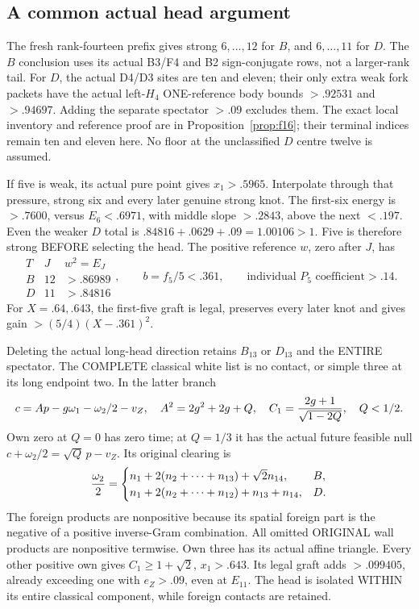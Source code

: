 \subsection{A common actual head argument}
\label{app:arithBD14typedhead}

The fresh rank-fourteen prefix gives strong
\(6,\ldots,12\) for \(B\), and \(6,\ldots,11\)
for \(D\).
The \(B\) conclusion uses its actual B3/F4 and
B2 sign-conjugate rows, not a larger-rank tail.
For \(D\), the actual D4/D3 sites are ten and eleven;
their only extra weak fork packets have the actual
left-\(H_4\) ONE-reference body bounds
\(>.92531\) and \(>.94697\).
Adding the separate spectator \(>.09\) excludes them.
The exact local inventory and reference proof are
in Proposition~\ref{prop:f16}; their terminal
indices remain ten and eleven here.
No floor at the unclassified \(D\) centre twelve
is assumed.

If five is weak, its actual pure point gives
\(x_1>.5965\).
Interpolate through that pressure, strong six and
every later genuine strong knot.
The first-six energy is \(>.7600\), versus \(E_6<.6971\),
with middle slope \(>.2843\), above the next \(<.197\).
Even the weaker \(D\) total is
\(.84816+.0629+.09=1.00106>1\).
Five is therefore strong BEFORE selecting the head.
The positive reference \(w\), zero after \(J\), has
\[
 \begin{array}{c|c|c}
 T&J&w^2=E_J\\ \hline
 B&12&>.86989\\
 D&11&>.84816
 \end{array},
 \qquad b=f_5/5<.361,\qquad
 \text{individual }P_5\text{ coefficient}>.14 .
\]
For \(X=.64,.643\), the first-five graft is legal,
preserves every later knot and gives gain
\(>(5/4)(X-.361)^2\).

Deleting the actual long-head direction retains
\(B_{13}\) or \(D_{13}\) and the ENTIRE spectator.
The COMPLETE classical white list is no contact,
or simple three at its long endpoint two.
In the latter branch
\[
 c=Ap-g\omega_1-\omega_2/2-v_Z,\quad
 A^2=2g^2+2g+Q,\quad
 C_1={2g+1\over\sqrt{1-2Q}},\quad Q<1/2 .
\]
Own zero at \(Q=0\) has zero time;
at \(Q=1/3\) it has the actual future feasible null
\(c+\omega_2/2=\sqrt Q\,p-v_Z\).
Its original clearing is
\[
 {\omega_2\over2}=
 \begin{cases}
 n_1+2(n_2+\cdots+n_{13})+\sqrt2n_{14},&B,\\
 n_1+2(n_2+\cdots+n_{12})+n_{13}+n_{14},&D .
 \end{cases}
\]
The foreign products are nonpositive because its
spatial foreign part is the negative of a positive
inverse-Gram combination.
All omitted ORIGINAL wall products are nonpositive
termwise.
Own three has its actual affine triangle.
Every other positive own gives
\(C_1\ge1+\sqrt2\), \(x_1>.643\).
Its legal graft adds \(>.099405\), already exceeding
one with \(e_Z>.09\), even at \(E_{11}\).
The head is isolated WITHIN its entire classical
component, while foreign contacts are retained.


